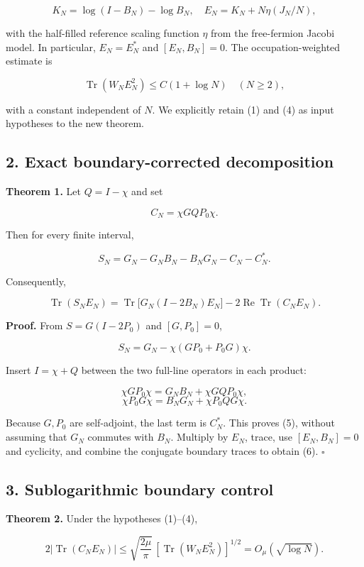 \documentclass[
  10pt,
  a4paper,
]{article}
\begin{document}
\[
K_N=\log(I-B_N)-\log B_N,
\quad E_N=K_N+N\eta(J_N/N),
\tag{3}
\]

with the half-filled reference scaling function \(\eta\) from the free-fermion Jacobi model. In particular, \(E_N=E_N^*\) and \([E_N,B_N]=0\). The occupation-weighted estimate is

\[
\operatorname{Tr}(W_NE_N^2)\le C(1+\log N)
\quad(N\ge2),
\tag{4}
\]

with a constant independent of \(N\). We explicitly retain (1) and (4) as input hypotheses to the new theorem.

\subsection{2. Exact boundary-corrected decomposition}\label{exact-boundary-corrected-decomposition}

\textbf{Theorem 1.} Let \(Q=I-\chi\) and set

\[
C_N=\chi GQP_0\chi.
\]

Then for every finite interval,

\[
\boxed{S_N=G_N-G_NB_N-B_NG_N-C_N-C_N^*.}
\tag{5}
\]

Consequently,

\[
\boxed{
\operatorname{Tr}(S_NE_N)
=\operatorname{Tr}\bigl[G_N(I-2B_N)E_N\bigr]
-2\operatorname{Re}\operatorname{Tr}(C_NE_N).
}
\tag{6}
\]

\textbf{Proof.} From \(S=G(I-2P_0)\) and \([G,P_0]=0\),

\[
S_N=G_N-\chi(GP_0+P_0G)\chi.
\]

Insert \(I=\chi+Q\) between the two full-line operators in each product:

\[
\chi GP_0\chi=G_NB_N+\chi GQP_0\chi,
\] \[
\chi P_0G\chi=B_NG_N+\chi P_0QG\chi.
\]

Because \(G,P_0\) are self-adjoint, the last term is \(C_N^*\). This proves (5), without assuming that \(G_N\) commutes with \(B_N\). Multiply by \(E_N\), trace, use \([E_N,B_N]=0\) and cyclicity, and combine the conjugate boundary traces to obtain (6). \(\square\)

\subsection{3. Sublogarithmic boundary control}\label{sublogarithmic-boundary-control}

\textbf{Theorem 2.} Under the hypotheses (1)--(4),

\[
\boxed{
2\left|\operatorname{Tr}(C_NE_N)\right|
\le\sqrt{\frac{2\mu}{\pi}}\,
\left[\operatorname{Tr}(W_NE_N^2)\right]^{1/2}
=O_\mu(\sqrt{\log N}).}
\tag{7}
\]
\end{document}
